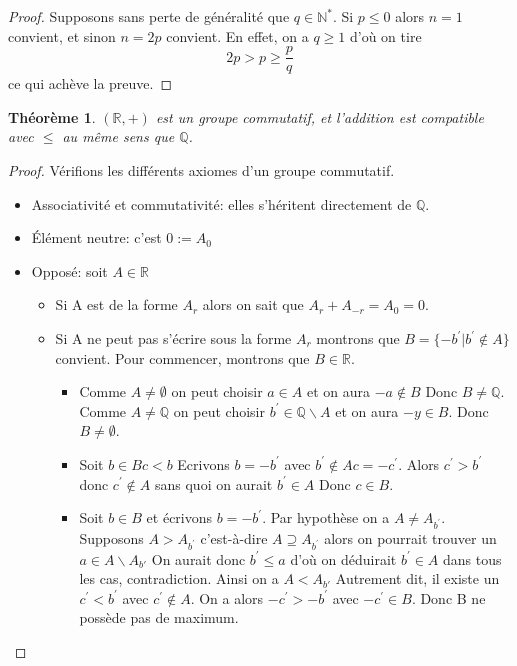 \documentclass[french]{book}
\theoremstyle{plain}
\newtheorem{thm}{Théorème}[chapter]
\theoremstyle{definition}
\theoremstyle{remark}
\begin{document}
\begin{proof}
	Supposons sans perte de généralité que $q \in \mathbb{N}^*$. Si $p \leqslant 0$ alors $n = 1$ convient, et sinon $n = 2p$ convient. En effet, on a $q \geqslant 1$ d'où on tire $$2p > p \geqslant \frac{p}{q}$$ ce qui achève la preuve.
\end{proof}
\begin{thm}
	$(\mathbb{R},+)$ est un groupe commutatif, et l'addition est compatible avec $\leqslant$ au même sens que $\mathbb{Q}$.
\end{thm}
\begin{proof}
	Vérifions les différents axiomes d'un groupe commutatif.
	\begin{itemize}
		\item Associativité et commutativité: elles s'héritent directement de $\mathbb{Q}$.
		\item Élément neutre: c'est $0:=A_{0}$
		\item Opposé: soit $A\in\mathbb{R}$
		\begin{itemize}
			\item[--]Si A est de la forme $A_{r}$ alors on sait que $A_{r}+A_{-r}=A_{0}=0$.
			\item[--]Si A ne peut pas s'écrire sous la forme $A_{r}$ montrons que $B=\{-b^{\prime}|b^{\prime}\notin A\}$ convient.
			Pour commencer, montrons que $B\in\mathbb{R}$.
			\begin{itemize}
				\item[*]Comme $A\ne\emptyset$ on peut choisir $a\in A$ et on aura $-a\notin B$ Donc $B\ne\mathbb{Q}$. \\
				Comme $A\ne\mathbb{Q}$ on peut choisir $b^{\prime}\in\mathbb{Q}\backslash A$ et on aura $-y\in B$. Donc $B\ne\emptyset$.
				\item[*]Soit $b\in B c<b$ Ecrivons $b=-b^{\prime}$ avec $b^{\prime}\notin A c=-c^{\prime}$. Alors $c^{\prime}>b^{\prime}$ donc $c^{\prime}\notin A$ sans quoi on aurait $b^{\prime}\in A$ Donc $c\in B$.
				\item[*] Soit $b\in B$ et écrivons $b=-b^{\prime}$. Par hypothèse on a $A\ne A_{b^{\prime}}$. Supposons $A>A_{b^{\prime}}$ c'est-à-dire $A\supseteq A_{b^{\prime}}$ alors on pourrait trouver un $a\in A\backslash A_{b'}$ On aurait donc $b^{\prime}\le a$ d'où on déduirait $b^{\prime}\in A$ dans tous les cas, contradiction. Ainsi on a $A<A_{b'}$ Autrement dit, il existe un $c^{\prime}<b^{\prime}$ avec $c^{\prime}\notin A$. On a alors $-c^{\prime}>-b^{\prime}$ avec $-c^{\prime}\in B$. Donc B ne possède pas de maximum.
			\end{itemize}

\end{itemize}
\end{itemize}
\end{proof}
\end{document}
